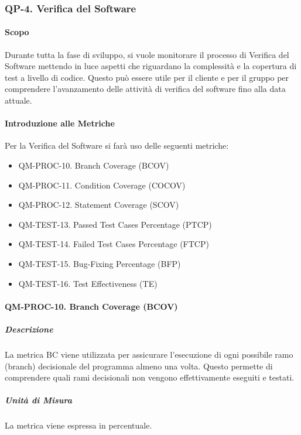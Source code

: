 	\subsubsection{QP-4. Verifica del Software}

		\paragraph{Scopo}
		
		Durante tutta la fase di sviluppo, si vuole monitorare il processo di Verifica del Software mettendo in luce aspetti che riguardano la complessità e la copertura di test a livello di codice. Questo può essere utile per il cliente e per il gruppo per comprendere l'avanzamento delle attività di verifica del software fino alla data attuale.

		\paragraph{Introduzione alle Metriche}

		Per la Verifica del Software si farà uso delle seguenti metriche:

		\begin{itemize}
			\item QM-PROC-10. Branch Coverage (BCOV)
			\item QM-PROC-11. Condition Coverage (COCOV)
			\item QM-PROC-12. Statement Coverage (SCOV)
			\item QM-TEST-13. Passed Test Cases Percentage (PTCP)
			\item QM-TEST-14. Failed Test Cases Percentage (FTCP)
			\item QM-TEST-15. Bug-Fixing Percentage (BFP)
			\item QM-TEST-16. Test Effectiveness (TE)
		\end{itemize}

		\paragraph{QM-PROC-10. Branch Coverage (BCOV)}

			\subparagraph{Descrizione}
			La metrica BC viene utilizzata per assicurare l'esecuzione di ogni possibile ramo (branch) decisionale del programma almeno una volta. Questo permette di comprendere quali rami decisionali non vengono effettivamente eseguiti e testati.

			\subparagraph{Unità di Misura}
			La metrica viene espressa in percentuale.

